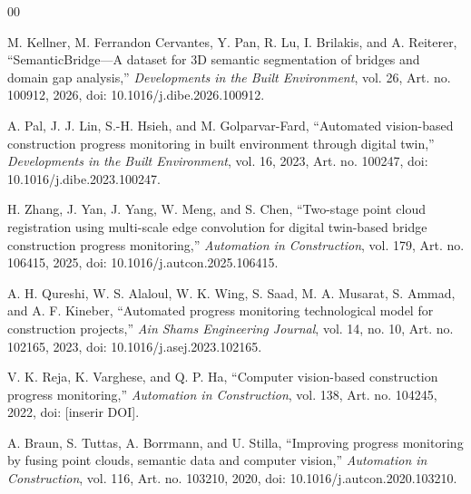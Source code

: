 \documentclass[conference]{IEEEtran}
\begin{document}
\begin{thebibliography}{00}

	M. Kellner, M. Ferrandon Cervantes, Y. Pan, R. Lu, I. Brilakis, and A. Reiterer,
	``SemanticBridge---A dataset for 3D semantic segmentation of bridges and domain gap analysis,''
	\textit{Developments in the Built Environment},
	vol. 26, Art. no. 100912, 2026,
	doi: 10.1016/j.dibe.2026.100912.
	
	A. Pal, J. J. Lin, S.-H. Hsieh, and M. Golparvar-Fard,
	``Automated vision-based construction progress monitoring in built environment through digital twin,''
	\textit{Developments in the Built Environment},
	vol. 16, 2023, Art. no. 100247,
	doi: 10.1016/j.dibe.2023.100247.
	
	H. Zhang, J. Yan, J. Yang, W. Meng, and S. Chen,
``Two-stage point cloud registration using multi-scale edge convolution for digital twin-based bridge construction progress monitoring,''
\textit{Automation in Construction},
vol. 179, Art. no. 106415, 2025,
doi: 10.1016/j.autcon.2025.106415.

	A. H. Qureshi, W. S. Alaloul, W. K. Wing, S. Saad, M. A. Musarat, S. Ammad, and A. F. Kineber,
``Automated progress monitoring technological model for construction projects,''
\textit{Ain Shams Engineering Journal},
vol. 14, no. 10, Art. no. 102165, 2023,
doi: 10.1016/j.asej.2023.102165.

V. K. Reja, K. Varghese, and Q. P. Ha,
``Computer vision-based construction progress monitoring,''
\textit{Automation in Construction},
vol. 138, Art. no. 104245, 2022,
doi: [inserir DOI].

A. Braun, S. Tuttas, A. Borrmann, and U. Stilla,
``Improving progress monitoring by fusing point clouds, semantic data and computer vision,''
\textit{Automation in Construction},
vol. 116, Art. no. 103210, 2020,
doi: 10.1016/j.autcon.2020.103210.


\end{thebibliography}
\end{document}
